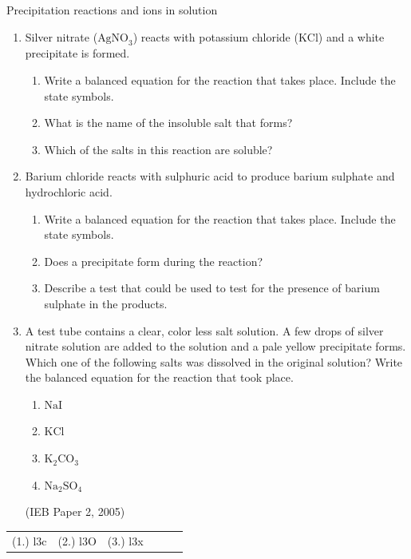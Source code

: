 {{\label{m38719*secfhsst!!!underscore!!!id1016}
            \begin{exercises}{Precipitation reactions and ions in solution }
            \nopagebreak
            \label{m38719*id341939}\begin{enumerate}[noitemsep, label=\textbf{\arabic*}. ] 
            \label{m38719*uid74}\item Silver nitrate (${\text{AgNO}}_{3}$) reacts with potassium chloride ($\text{KCl}$) and a white precipitate is formed.
\label{m38719*id341969}\begin{enumerate}[noitemsep, label=\textbf{\alph*}. ] 
            \label{m38719*uid75}\item Write a balanced equation for the reaction that takes place. Include the state symbols. 
\label{m38719*uid76}\item What is the name of the insoluble salt that forms?
\label{m38719*uid77}\item Which of the salts in this reaction are soluble?
\end{enumerate}
\label{m38719*uid78}\item Barium chloride reacts with sulphuric acid to produce barium sulphate and hydrochloric acid.
\label{m38719*id342022}\begin{enumerate}[noitemsep, label=\textbf{\alph*}. ] 
            \label{m38719*uid79}\item Write a balanced equation for the reaction that takes place. Include the state symbols.
\label{m38719*uid80}\item Does a precipitate form during the reaction? 
\label{m38719*uid81}\item Describe a test that could be used to test for the presence of barium sulphate in the products.
\end{enumerate}
\label{m38719*uid82}\item A test tube contains a clear, color less salt solution. A few drops of silver nitrate solution are added to the solution and a pale yellow precipitate forms. Which one of the following salts was dissolved in the original solution? Write the balanced equation for the reaction that took place.
\label{m38719*id342078}\begin{enumerate}[noitemsep, label=\textbf{\alph*}. ] 
            \label{m38719*uid83}\item $\text{NaI}$
\label{m38719*uid84}\item $\text{KCl}$
\label{m38719*uid85}\item ${\text{K}}_{2}{\text{CO}}_{3}$\label{m38719*uid86}\item ${\text{Na}}_{2}{\text{SO}}_{4}$\end{enumerate}
(IEB Paper 2, 2005)\newline
\end{enumerate}
\practiceinfo
\par 
 \par \begin{tabular}[h]{cccccc}
 (1.) l3c  &  (2.) l3O  &  (3.) l3x  & \end{tabular}
\end{exercises}
}}
